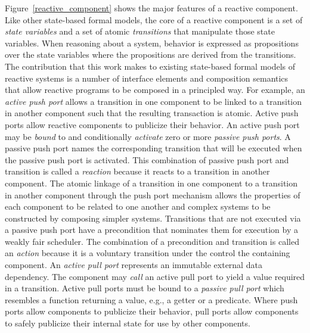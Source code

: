 Figure~\ref{reactive_component} shows the major features of a reactive component.
Like other state-based formal models, the core of a reactive component is a set of \emph{state variables} and a set of atomic \emph{transitions} that manipulate those state variables.
When reasoning about a system, behavior is expressed as propositions over the state variables where the propositions are derived from the transitions.
The contribution that this work makes to existing state-based formal models of reactive systems is a number of interface elements and composition semantics that allow reactive programs to be composed in a principled way.
For example, an \emph{active push port} allows a transition in one component to be linked to a transition in another component such that the resulting transaction is atomic.
Active push ports allow reactive components to publicize their behavior.
An active push port may be \emph{bound} to and conditionally \emph{activate} zero or more \emph{passive push ports}.
A passive push port names the corresponding transition that will be executed when the passive push port is activated.
This combination of passive push port and transition is called a \emph{reaction} because it reacts to a transition in another component.
The atomic linkage of a transition in one component to a transition in another component through the push port mechanism allows the properties of each component to be related to one another and complex systems to be constructed by composing simpler systems.
Transitions that are not executed via a passive push port have a precondition that nominates them for execution by a weakly fair scheduler.
The combination of a precondition and transition is called an \emph{action} because it is a voluntary transition under the control the containing component.
An \emph{active pull port} represents an immutable external data dependency.
The component may \emph{call} an active pull port to yield a value required in a transition.
Active pull ports must be bound to a \emph{passive pull port} which resembles a function returning a value, e.g., a getter or a predicate.
Where push ports allow components to publicize their behavior, pull ports allow components to safely publicize their internal state for use by other components.

